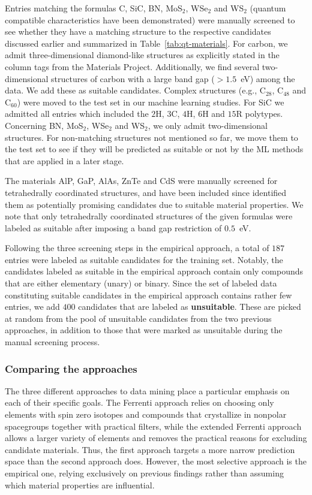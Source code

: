 \documentclass[superscriptaddress,unsortedaddress,
 amsmath,amssymb,
 aps,
]{revtex4-2}
\begin{document}
Entries matching the formulas C, SiC, BN, MoS$_2$, WSe$_2$ and WS$_2$ (quantum compatible characteristics have been demonstrated) were manually screened to see whether they have a matching structure to the respective candidates discussed earlier and summarized in Table~\ref{tab:qt-materials}. 
For carbon, we admit three-dimensional diamond-like structures as explicitly stated in the column tags from the Materials Project. Additionally, we find several two-dimensional structures of carbon with a large band gap ($>1.5$~eV) among the data. We add these as suitable candidates. Complex structures (e.g., C$_{28}$, C$_{48}$ and C$_{60}$) were moved to the test set in our machine learning studies. For SiC we admitted all entries which included the $2$H, $3$C, $4$H, $6$H and $15$R polytypes. Concerning BN, MoS$_2$, WSe$_2$ and WS$_2$, we only admit two-dimensional structures. For non-matching structures not mentioned so far, we move them to the test set to see if they will be predicted as suitable or not by the ML methods that are applied in a later stage.

The materials AlP, GaP, AlAs, ZnTe and CdS were manually screened for tetrahedrally coordinated structures, and have been included since \citeauthor{Weber2010} \cite{Weber2010} identified them as potentially promising candidates due to suitable material properties. 
We note that only tetrahedrally coordinated structures of the given formulas were labeled as suitable after imposing a band gap restriction of $0.5$~eV. 

Following the three screening steps in the empirical approach, a total of $187$ entries were labeled as suitable candidates for the training set. 
Notably, the candidates labeled as suitable in the empirical approach contain only compounds that are either elementary (unary) or binary. 
Since the set of labeled data constituting suitable candidates in the empirical approach contains rather few entries, we add $400$ candidates that are labeled as \textbf{unsuitable}. These are picked at random from the pool of unsuitable candidates from the two previous approaches, in addition to those that were marked as unsuitable during the manual screening process. 

\subsubsection*{Comparing the approaches}
The three different approaches to data mining place a particular emphasis on each of their specific goals. The Ferrenti approach relies on choosing only elements with spin zero isotopes and compounds that crystallize in nonpolar spacegroups together with practical filters, while the extended Ferrenti approach allows a larger variety of elements and removes the practical reasons for excluding candidate materials. Thus, the first approach targets a more narrow prediction space than the second approach does. However, the most selective approach is the empirical one, relying exclusively on previous findings rather than assuming which material properties are influential. 
\end{document}
